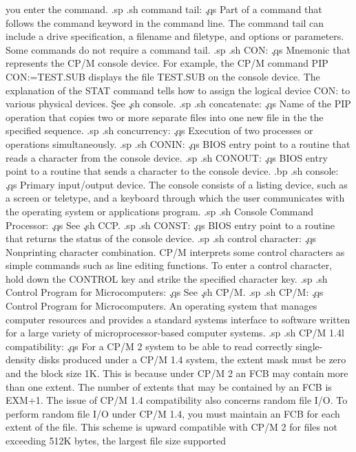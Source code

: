 you enter the command.
.sp
.sh
command tail:  \c
.qs
Part of a command that follows the command keyword in the command 
line.  The command tail can include a drive specification, a 
filename and filetype, and options or parameters.  Some 
commands do not require a command tail.
.sp
.sh
CON:  \c
.qs
Mnemonic that represents the CP/M console device.  
For example, the CP/M command PIP CON:=TEST.SUB displays the 
file TEST.SUB on the console device.  The explanation of the STAT 
command tells how to assign the logical device CON: to various 
physical devices.  \c
See \c
.sh
console.  
.sp
.sh
concatenate:  \c
.qs
Name of the PIP operation that copies two or more separate files 
into one new file in the the specified sequence.
.sp
.sh
concurrency:  \c
.qs
Execution of two processes or operations simultaneously.
.sp
.sh
CONIN:  \c
.qs
BIOS entry point to a routine that reads a character from the 
console device.
.sp
.sh
CONOUT:  \c
.qs
BIOS entry point to a routine that sends a character to the 
console device.
.bp
.sh
console:  \c
.qs
Primary input/output device.  The console consists of a listing 
device, such as a screen or teletype, and a keyboard through 
which the user communicates with the operating system or 
applications program.
.sp
.sh
Console Command Processor:  \c
.qs
See \c
.sh
CCP.
.sp
.sh
CONST:  \c
.qs
BIOS entry point to a routine that returns the status of the 
console device.
.sp
.sh
control character:  \c
.qs
Nonprinting character combination.  CP/M interprets some control 
characters as simple commands such as line editing functions.  To 
enter a control character, hold down the CONTROL key and strike 
the specified character key.
.sp
.sh
Control Program for Microcomputers:  \c
.qs
See \c
.sh
CP/M.
.sp
.sh
CP/M:  \c
.qs
Control Program for Microcomputers.  An operating system that 
manages computer resources and provides a standard systems 
interface to software written for a large variety of 
microprocessor-based computer systems.
.sp
.sh
CP/M 1.4l compatibility:  \c
.qs
For a CP/M 2 system to be able to read correctly single-density 
disks produced under a CP/M 1.4 system, the extent mask must be 
zero and the block size 1K.  This is because under CP/M 2 an FCB 
may contain more than one extent.  The number of extents that may 
be contained by an FCB is EXM+1.  The issue of CP/M 1.4 
compatibility also concerns random file I/O.  To perform random 
file I/O under CP/M 1.4, you must maintain an FCB for each extent 
of the file.  This scheme is upward compatible with CP/M 2 for 
files not exceeding 512K bytes, the largest file size supported 
